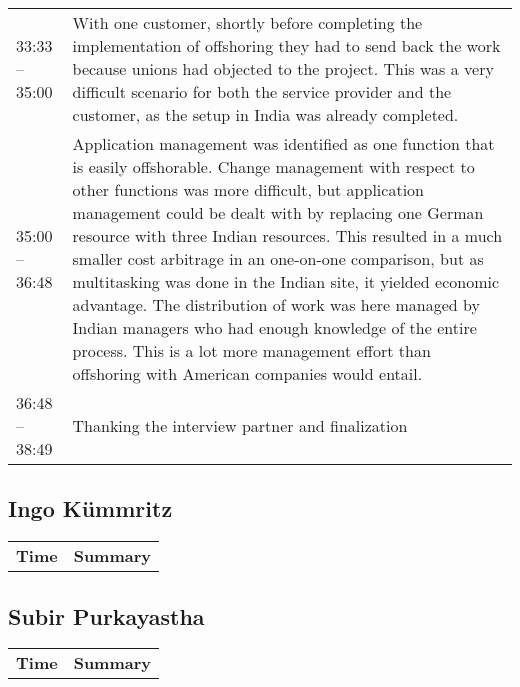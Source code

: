 \begin{appendix}
\begin{longtable}{l p{12.5cm}}
	33:33 -- 35:00& With one customer, shortly before completing the implementation of offshoring they had to send back the work because unions had objected to the project. This was a very difficult scenario for both the service provider and the customer, as the setup in India was already completed.\\
	35:00 -- 36:48&Application management was identified as one function that is easily offshorable. Change management with respect to other functions was more difficult, but application management could be dealt with by replacing one German resource with three Indian resources. This resulted in a much smaller cost arbitrage in an one-on-one comparison, but as multitasking was done in the Indian site, it yielded economic advantage. The distribution of work was here managed by Indian managers who had enough knowledge of the entire process. This is a lot more management effort than offshoring with American companies would entail.\\
	36:48 -- 38:49& Thanking the interview partner and finalization\\ 
\end{longtable}

\tocless\subsection{Ingo Kümmritz}

\begin{longtable}{l p{12.5cm}}
	\textbf{Time} & \textbf{Summary} \\ 
	
\end{longtable}

\tocless\subsection{Subir Purkayastha}

\begin{longtable}{l p{12.5cm}}
	\textbf{Time} & \textbf{Summary} \\ 
	
\end{longtable}	

\end{appendix}	